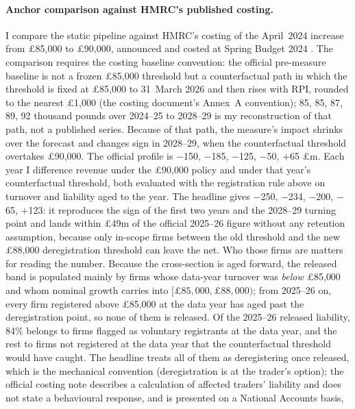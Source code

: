 \paragraph{Anchor comparison against HMRC's published costing.} I compare the
static pipeline against HMRC's costing of the April~2024 increase from
\pounds85{,}000 to \pounds90{,}000, announced and costed at Spring Budget 2024
\citep{hmt_spring_budget_2024}. The comparison requires the costing baseline
convention: the official pre-measure baseline is not a frozen \pounds85{,}000
threshold but a counterfactual path in which the threshold is fixed at
\pounds85{,}000 to 31~March 2026 and then rises with RPI, rounded to the
nearest \pounds1{,}000 (the costing document's Annex~A convention); 85, 85, 87,
89, 92 thousand pounds over 2024--25 to 2028--29 is my reconstruction of that
path, not a published series. Because of that path,
the measure's impact shrinks over the forecast and changes sign in 2028--29,
when the counterfactual threshold overtakes \pounds90{,}000. The official
profile is $-$150, $-$185, $-$125, $-$50, $+$65 \pounds m. Each year I
difference revenue under the \pounds90{,}000 policy and under that year's
counterfactual threshold, both evaluated with the registration rule above on
turnover and liability aged to the year. The headline gives
$-$250, $-$234, $-$200, $-$65, $+$123: it reproduces the sign of the first two years and the 2028--29
turning point and lands within \pounds49m of the official 2025--26
figure without any retention assumption, because only in-scope firms
between the old threshold and the new \pounds88{,}000 deregistration threshold
can leave the net. Who those firms are matters for reading the number. Because
the cross-section is aged forward, the released band is populated mainly by
firms whose data-year turnover was \emph{below} \pounds85{,}000 and whom
nominal growth carries into $[\pounds85{,}000,\pounds88{,}000)$; from 2025--26
on, every firm registered above \pounds85{,}000 at the data year has aged past
the deregistration point, so none of them is released. Of the 2025--26 released
liability, 84\% belongs to firms flagged as voluntary registrants
at the data year, and the rest to firms not registered at the data year that
the counterfactual threshold would have caught. The headline treats all of
them as deregistering once released, which is the mechanical convention
(deregistration is at the trader's option); the official costing note
describes a calculation of affected traders' liability and does not state
a behavioural response, and is presented on a National Accounts basis,
